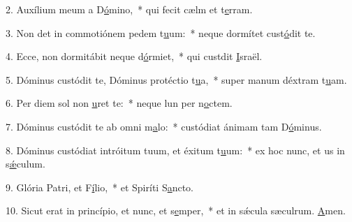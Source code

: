 2. Auxílium meum a D\uline{ó}mino,~* qui fecit cælm et t\uline{e}rram.\par 
3. Non det in commotiónem pedem t\uline{u}um:~* neque dormítet  cust\uline{ó}dit te.\par 
4. Ecce, non dormitábit neque d\uline{ó}rmiet,~* qui custdit \uline{I}sraël.\par 
5. Dóminus custódit te, Dóminus protéctio t\uline{u}a,~* super manum déxtram t\uline{u}am.\par 
6. Per diem sol non \uline{u}ret te:~* neque lun per n\uline{o}ctem.\par 
7. Dóminus custódit te ab omni m\uline{a}lo:~* custódiat ánimam tam D\uline{ó}minus.\par 
8. Dóminus custódiat intróitum tuum, et éxitum t\uline{u}um:~* ex hoc nunc, et us in s\uline{ǽ}culum.\par 
9. Glória Patri, et F\uline{í}lio,~* et Spiríti S\uline{a}ncto.\par 
10. Sicut erat in princípio, et nunc, et s\uline{e}mper,~* et in sǽcula sæculrum. \uline{A}men.\par 
